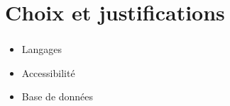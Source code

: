 \documentclass[11pt]{beamer}
\begin{document}
\section{Choix et justifications	}	

\begin{frame}
	\frametitle{\secname}
	\begin{block}{}
		\begin{itemize}
		\item Langages
		\item Accessibilité
		\item Base de données 
		\end{itemize}
	\end{block}
\end{frame}
\end{document}
